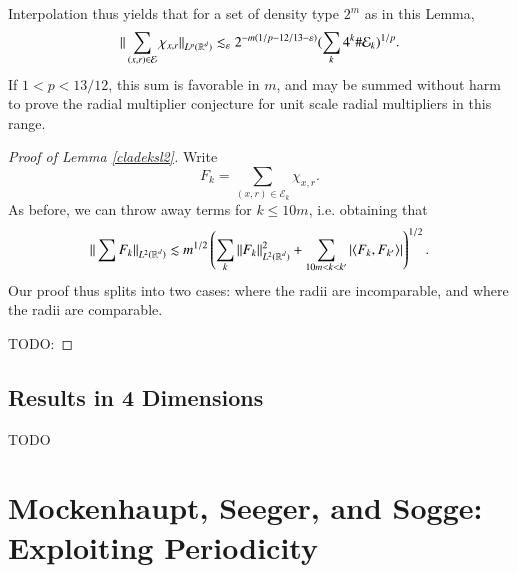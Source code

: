 Interpolation thus yields that for a set of density type $2^m$ as in this Lemma,
%
\[ \| \sum_{(x,r) \in \mathcal{E}} \chi_{x,r} \|_{L^p(\operatorname{\mathbb{R}}^d)} \lesssim_\varepsilon 2^{-m(1/p - 12/13 - \varepsilon)} ( \sum_k 4^k \# \mathcal{E}_k )^{1/p}. \]
%
If $1 < p < 13/12$, this sum is favorable in $m$, and may be summed without harm to prove the radial multiplier conjecture for unit scale radial multipliers in this range.

\begin{proof} [Proof of Lemma \ref{cladeksl2}]
    Write
    \[ F_k = \sum_{(x,r) \in \mathcal{E}_k} \chi_{x,r}. \]
    As before, we can throw away terms for $k \leq 10 m$, i.e. obtaining that
    \[ \| \sum F_k \|_{L^2(\operatorname{\mathbb{R}}^d)} \lesssim m^{1/2} \left( \sum_k \| F_k \|_{L^2(\operatorname{\mathbb{R}}^d)}^2 + \sum_{10m < k < k'} |\langle F_k, F_{k'} \rangle| \right)^{1/2}. \]
    Our proof thus splits into two cases: where the radii are incomparable, and where the radii are comparable.

    TODO:
\end{proof}

\section{Results in 4 Dimensions}

TODO





\chapter[MSS: Exploiting Periodicity]{Mockenhaupt, Seeger, and Sogge: Exploiting Periodicity}

